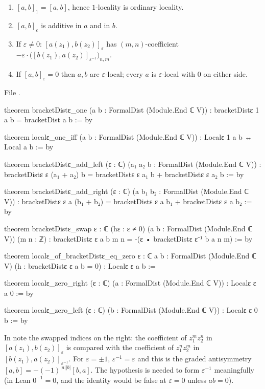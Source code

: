 \begin{proposition}\label{l01:prop:epsbasic}
\leavevmode
\begin{enumerate}[label=(\alph*)]
\item $[a,b]_1 = [a,b]$, hence $1$-locality is ordinary locality.
\item $[a,b]_\varepsilon$ is additive in $a$ and in $b$.
\item If $\varepsilon\neq0$: $[a(z_1),b(z_2)]_\varepsilon$ has $(m,n)$-coefficient
  $-\varepsilon\cdot\big([b(z_1),a(z_2)]_{\varepsilon^{-1}}\big)_{n,m}$.
\item If $[a,b]_\varepsilon = 0$ then $a,b$ are $\varepsilon$-local; every $a$ is $\varepsilon$-local with $0$ on either side.
\end{enumerate}
\end{proposition}

\noindent File .
\begin{leancode}
theorem bracketDistε_one (a b : FormalDist (Module.End ℂ V)) :
    bracketDistε 1 a b = bracketDist a b := by

theorem localε_one_iff (a b : FormalDist (Module.End ℂ V)) :
    Localε 1 a b ↔ Local a b := by

theorem bracketDistε_add_left (ε : ℂ) (a₁ a₂ b : FormalDist (Module.End ℂ V)) :
    bracketDistε ε (a₁ + a₂) b = bracketDistε ε a₁ b + bracketDistε ε a₂ b := by

theorem bracketDistε_add_right (ε : ℂ) (a b₁ b₂ : FormalDist (Module.End ℂ V)) :
    bracketDistε ε a (b₁ + b₂) = bracketDistε ε a b₁ + bracketDistε ε a b₂ := by

theorem bracketDistε_swap {ε : ℂ} (hε : ε ≠ 0) (a b : FormalDist (Module.End ℂ V)) (m n : ℤ) :
    bracketDistε ε a b m n = -(ε • bracketDistε ε⁻¹ b a n m) := by

theorem localε_of_bracketDistε_eq_zero {ε : ℂ} {a b : FormalDist (Module.End ℂ V)}
    (h : bracketDistε ε a b = 0) : Localε ε a b :=

theorem localε_zero_right (ε : ℂ) (a : FormalDist (Module.End ℂ V)) : Localε ε a 0 := by

theorem localε_zero_left (ε : ℂ) (b : FormalDist (Module.End ℂ V)) : Localε ε 0 b := by
\end{leancode}

\begin{dictionary}
In  note the swapped indices  on the right: the coefficient of $z_1^mz_2^n$ in
$[a(z_1),b(z_2)]_\varepsilon$ is compared with the coefficient of $z_1^nz_2^m$ in $[b(z_1),a(z_2)]_{\varepsilon^{-1}}$. For
$\varepsilon = \pm1$, $\varepsilon^{-1} = \varepsilon$ and this is the graded antisymmetry
$[a,b] = -(-1)^{|a||b|}[b,a]$. The hypothesis  is needed to form $\varepsilon^{-1}$ meaningfully
(in Lean $0^{-1} = 0$, and the identity would be false at $\varepsilon = 0$ unless $ab = 0$).
\end{dictionary}

